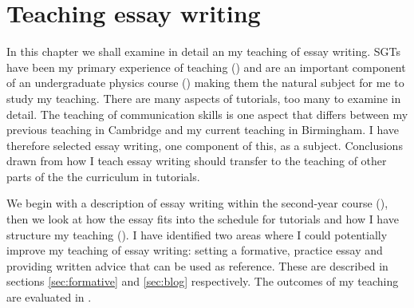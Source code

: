 \chapter{Teaching essay writing}\label{ch:essay}

In this chapter we shall examine in detail an my teaching of essay writing. SGTs have been my primary experience of teaching () and are an important component of an undergraduate physics course () making them the natural subject for me to study my teaching. There are many aspects of tutorials, too many to examine in detail. The teaching of communication skills is one aspect that differs between my previous teaching in Cambridge and my current teaching in Birmingham. I have therefore selected essay writing, one component of this, as a subject. Conclusions drawn from how I teach essay writing should transfer to the teaching of other parts of the the curriculum in tutorials.

We begin with a description of essay writing within the second-year course (), then we look at how the essay fits into the schedule for tutorials and how I have structure my teaching (). I have identified two areas where I could potentially improve my teaching of essay writing: setting a formative, practice essay and providing written advice that can be used as reference. These are described in sections \ref{sec:formative} and \ref{sec:blog} respectively. The outcomes of my teaching are evaluated in .

